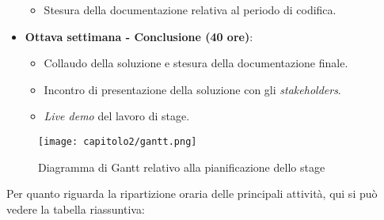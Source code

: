 \begin{itemize}
\begin{itemize}
      \item Stesura della documentazione relativa al periodo di codifica.
  \end{itemize}
  \item \textbf{Ottava settimana - Conclusione (40 ore)}:
  \begin{itemize}
      \item Collaudo della soluzione e stesura della documentazione finale.
      \item Incontro di presentazione della soluzione con gli \emph{stakeholders}.
      \item \emph{Live demo} del lavoro di stage.
  \end{itemize}
\end{itemize}

\begin{figure}[!h]
  \centering
  \texttt{[image: capitolo2/gantt.png]}
  \caption{Diagramma di Gantt relativo alla pianificazione dello stage}
\end{figure}

Per quanto riguarda la ripartizione oraria delle principali attività, qui si può vedere la tabella riassuntiva: \\



